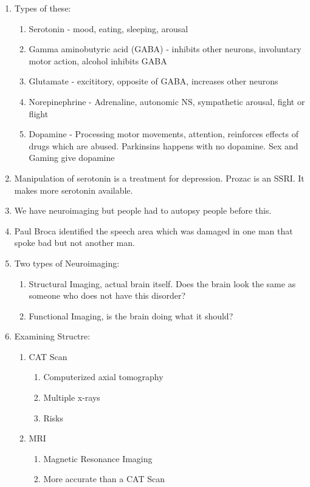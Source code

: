 \documentclass[12pt]{article}
\begin{document}
\begin{enumerate}
\begin{enumerate}
  \end{enumerate}
\item Types of these:
  \begin{enumerate}
  \item Serotonin - mood, eating, sleeping, arousal
  \item Gamma aminobutyric acid (GABA) - inhibits other neurons,
    involuntary motor action, alcohol inhibits GABA
  \item Glutamate - excititory, opposite of GABA, increases other neurons
  \item Norepinephrine - Adrenaline, autonomic NS, sympathetic
    arousal, fight or flight
  \item Dopamine - Processing motor movements, attention, reinforces
    effects of drugs which are abused. Parkinsins happens with no
    dopamine. Sex and Gaming give dopamine
  \end{enumerate}
\item Manipulation of serotonin is a treatment for depression. Prozac
  is an SSRI. It makes more serotonin available.
\item We have neuroimaging but people had to autopsy people before this.
\item Paul Broca identified the speech area which was damaged in one
  man that spoke bad but not another man.
\item Two types of Neuroimaging:
  \begin{enumerate}
  \item Structural Imaging, actual brain itself. Does the brain look
    the same as someone who does not have this disorder?
  \item Functional Imaging, is the brain doing what it should?
  \end{enumerate}
\item Examining Structre:
  \begin{enumerate}
  \item CAT Scan
    \begin{enumerate}
    \item Computerized axial tomography
    \item Multiple x-rays
    \item Risks
    \end{enumerate}
  \item MRI
    \begin{enumerate}
    \item Magnetic Resonance Imaging
    \item More accurate than a CAT Scan

\end{enumerate}
\end{enumerate}
\end{enumerate}
\end{document}
